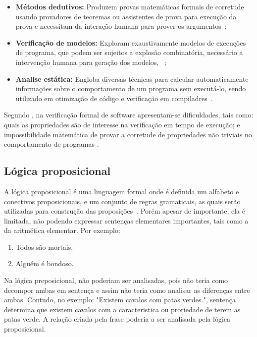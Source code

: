 \begin{itemize}
 \item \textbf{Métodos dedutivos:} Produzem provas matemáticas formais de corretude usando provadores de teoremas ou assistentes de prova para execução da prova e necessitam da interação humana para prover os argumentos~\cite{cousot2010gentle};
  \item \textbf{Verificação de modelos:} Exploram exaustivamente modelos de execuções de programa, que podem ser sujeitos a explosão combinatória, necessário a intervenção humana para geração dos modelos, \textcolor{red}{}~\cite{rocha2015verificaccao};
  \item \textbf{Analise estática:} Engloba diversas técnicas para calcular automaticamente informações sobre o comportamento de um programa sem executá-lo, sendo utilizado em otimização de código e verificação em compiladres~\cite{d2008survey}.
\end{itemize}

Segundo , na verificação formal de software apresentam-se dificuldades, tais como: quais as propriedades são de interesse na verificação em tempo de execução; e impossibilidade matemática de provar a corretude de propriedades não triviais no comportamento de programas  \cite{cousot2010gentle}. 

\subsection{Lógica proposicional}

A lógica proposicional é uma linguagem formal onde é definida um alfabeto e conectivos proposicionais, e um conjunto de regras gramaticais, as quais serão utilizadas para construção das proposições~\cite{souza2017logica}. Porém apesar de importante, ela é limitada, não podendo expressar sentenças elementares importantes, tais como a da aritmética elementar. Por exemplo:
\begin{enumerate}
\item Todos são mortais.
\item Alguém é bondoso.
\end{enumerate}

\par
Na lógica preposicional, não poderiam ser analisadas, pois não teria como decompor ambas em sentença e assim não teria como analisar as diferenças entre ambas. Contudo, no exemplo: "Existem cavalos com patas verdes.", sentença determina que existem cavalos com a caracteristica ou proriedade de terem as patas verde. A relação criada pela frase poderia a ser analisada pela lógica proposicional\cite{abe2002introducao}.


